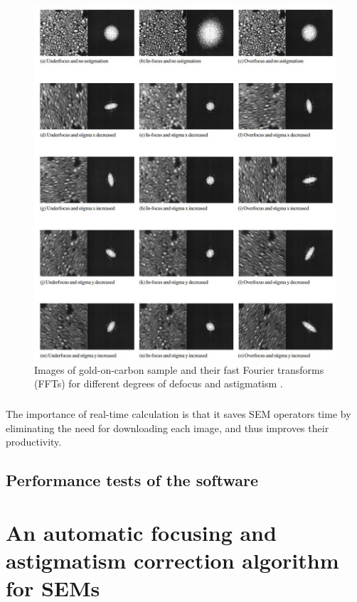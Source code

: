 \documentclass[12pt, twocolumn]{report}
\begin{document}
\begin{figure}
    \centering
    \includegraphics[width=1.05\textwidth]{Figures/SEM astigmatism and FFT.jpg}
    \caption{Images of gold-on-carbon sample and their fast Fourier transforms (FFTs) for different degrees of defocus and astigmatism \cite{SEM correction algorithm}.}
    \label{SEM astigmatism}
\end{figure}

\paragraph{}
The importance of real-time calculation is that it saves SEM operators time by eliminating the need for downloading each image, and thus improves their productivity.

\section{Performance tests of the software}


\chapter{An automatic focusing and astigmatism correction algorithm for SEMs} \label{An automatic focusing and astigmatism correction algorithm for SEMs}
\end{document}
